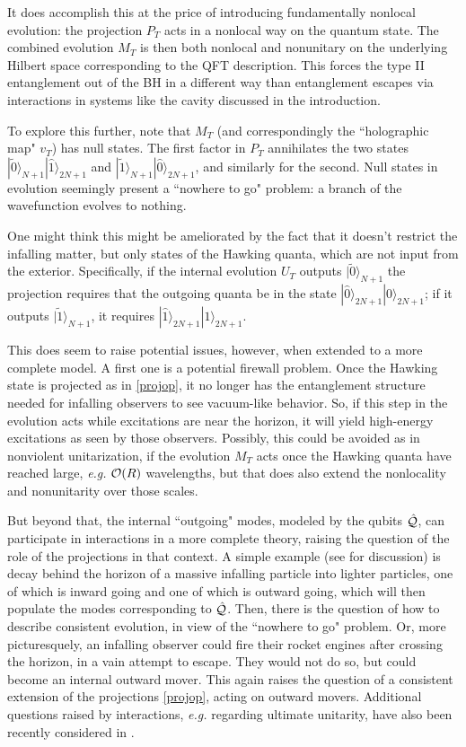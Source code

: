\documentclass[12pt]{article}
\numberwithin{equation}{section}
\newcommand{\calo}{{\cal O}}
\newcommand{\calq}{{\cal Q}}
\begin{document}
It does accomplish this at the price of introducing fundamentally nonlocal evolution:  the projection $P_T$ acts in a nonlocal way on the quantum state.  The combined evolution $M_T$  is then both nonlocal and nonunitary on the underlying Hilbert space corresponding to the QFT description.  This forces the type II entanglement out of the BH in a different way than entanglement escapes via interactions in systems like the cavity discussed in the introduction.

To explore this further, note that $M_T$ (and correspondingly the ``holographic map" $v_T$) has null states.  The first factor in $P_T$ annihilates the two states $| \tilde 0\rangle_{N+1} | \hat 1\rangle_{2N+1}$ and $| \tilde 1\rangle_{N+1} | \hat 0\rangle_{2N+1}$, and similarly for the second.  Null states in evolution seemingly present a ``nowhere to go" problem:  a branch of the wavefunction evolves to nothing.  

One might think this might be ameliorated by the fact that it doesn't restrict the infalling matter, but only states of the Hawking quanta, which are not input from the exterior.  Specifically, if the internal evolution $U_T$ outputs $|\tilde 0\rangle_{N+1}$ the projection requires that the outgoing quanta be in the state $|\hat 0\rangle_{2N+1}| 0\rangle_{2N+1}$; if it outputs $|\tilde 1\rangle_{N+1}$, it requires $|\hat 1\rangle_{2N+1}| 1\rangle_{2N+1}$.

This does seem to raise potential issues, however, when extended to a more complete model.  A first one is a potential firewall problem.  Once the Hawking state is projected as in \eqref{projop}, it no longer has the entanglement structure needed for infalling observers to see vacuum-like behavior.  So, if this step in the evolution acts while excitations are near the horizon, it will yield high-energy excitations as seen by those observers.  Possibly, this could be avoided as in nonviolent unitarization, if the evolution $M_T$ acts once the Hawking quanta have reached large, {\it e.g.} $\calo(R)$ wavelengths, but that does also extend the nonlocality and nonunitarity over those scales.

 But beyond that, the internal ``outgoing" modes, modeled by the qubits $\hat \calq$, can participate in interactions in a more complete theory, raising the question of the role of the projections in that context.  A simple example (see \cite{SE2d} for discussion) is decay behind the horizon of a massive infalling particle into lighter particles, one of which is inward going and one of which is outward going, which will then populate the modes corresponding to $\hat \calq$.  Then, there is the question of how to describe consistent evolution, in view of the ``nowhere to go" problem.  Or, more picturesquely, an infalling observer could fire their rocket engines after crossing the horizon, in a vain attempt to escape.  They would not do so, but could become an internal outward mover.  This again raises the question of a consistent extension of the projections \eqref{projop}, acting on outward movers.
Additional questions raised by interactions, {\it e.g.} regarding ultimate unitarity, have also been recently considered in \cite{KiPr}.
\end{document}
